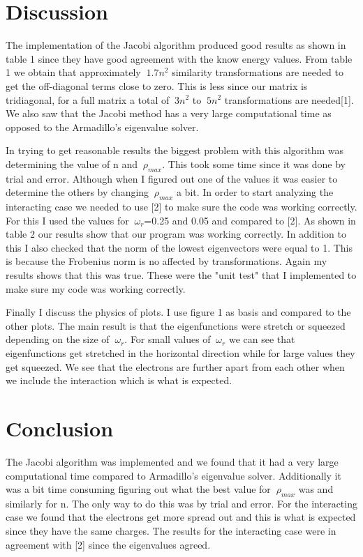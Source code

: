 \documentclass[11pt,a4wide]{article}
\begin{document}
\section{Discussion}
The implementation of the Jacobi algorithm produced good results as shown in table 1 since they have good agreement with the know energy values. From table 1 we obtain that approximately $\ 1.7n^2$ similarity transformations are needed to get the off-diagonal terms close to zero. This is less since our matrix is tridiagonal, for a full matrix a total of $\ 3n^2$ to $\ 5n^2$ transformations are needed[1]. We also saw that the Jacobi method has a very large computational time as opposed to the Armadillo's eigenvalue solver. 

In trying to get reasonable results the biggest problem with this algorithm was determining the value of n and $\ \rho_{max}$. This took some time since it was done by trial and error. Although when I figured out one of the values it was easier to determine the others by changing $\ \rho_{max}$ a bit. In order to start analyzing the interacting case we needed to use [2] to make sure the code was working correctly. For this I used the values for $\ \omega_r $=0.25 and 0.05 and compared to [2]. As shown in table 2 our results show that our program was working correctly. In addition to this I also checked that the norm of the lowest eigenvectors were equal to 1. This is because the Frobenius norm is no affected by transformations. Again my results shows that this was true. These were the "unit test" that I implemented to make sure my code was working correctly.

Finally I discuss the physics of plots. I use figure 1 as basis and compared to the other plots. The main result is that the eigenfunctions were stretch or squeezed depending on the size of $\ \omega_r$. For small values of $\ \omega_r$ we can see that eigenfunctions get stretched in the horizontal direction while for large values they get squeezed. We see that the electrons are further apart from each other when we include the interaction which is what is expected. 

\section{Conclusion}
The Jacobi algorithm was implemented and we found that it had a very large computational time compared to Armadillo's eigenvalue solver. Additionally it was a bit time consuming figuring out what the best value for $\ \rho_{max}$ was and similarly for n. The only way to do this was by trial and error. For the interacting case we found that the electrons get more spread out and this is what is expected since they have the same charges. The results for the interacting case were in agreement with [2] since the eigenvalues agreed. 
\end{document}
